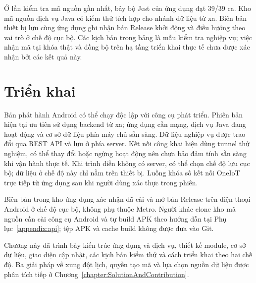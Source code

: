 \documentclass[../DoAn.tex]{subfiles}
\begin{document}
Ở lần kiểm tra mã nguồn gần nhất, bảy bộ Jest của ứng dụng đạt 39/39 ca. Kho mã nguồn dịch vụ Java có kiểm thử tích hợp cho nhánh dữ liệu từ xa. Biên bản thiết bị lưu cùng ứng dụng ghi nhận bản Release khởi động và điều hướng theo vai trò ở chế độ cục bộ. Các kịch bản trong bảng là mẫu kiểm tra nghiệp vụ; việc nhận mã tại khóa thật và đồng bộ trên hạ tầng triển khai thực tế chưa được xác nhận bởi các kết quả này.

\section{Triển khai}
Bản phát hành Android có thể chạy độc lập với công cụ phát triển. Phiên bản hiện tại ưu tiên sử dụng backend từ xa; ứng dụng cần mạng, dịch vụ Java đang hoạt động và cơ sở dữ liệu phía máy chủ sẵn sàng. Dữ liệu nghiệp vụ được trao đổi qua REST API và lưu ở phía server. Kết nối công khai hiện dùng tunnel thử nghiệm, có thể thay đổi hoặc ngừng hoạt động nên chưa bảo đảm tính sẵn sàng khi vận hành thực tế. Khi trình diễn không có server, có thể chọn chế độ lưu cục bộ; dữ liệu ở chế độ này chỉ nằm trên thiết bị. Luồng khóa số kết nối OneIoT trực tiếp từ ứng dụng sau khi người dùng xác thực trong phiên.

Biên bản trong kho ứng dụng xác nhận đã cài và mở bản Release trên điện thoại Android ở chế độ cục bộ, không phụ thuộc Metro. Người khác clone kho mã nguồn cần cài công cụ Android và tự build APK theo hướng dẫn tại Phụ lục~\ref{appendix:api}; tệp APK và cache build không được đưa vào Git.

Chương này đã trình bày kiến trúc ứng dụng và dịch vụ, thiết kế module, cơ sở dữ liệu, giao diện cập nhật, các kịch bản kiểm thử và cách triển khai theo hai chế độ. Ba giải pháp về xung đột lịch, quyền tạo mã và lựa chọn nguồn dữ liệu được phân tích tiếp ở Chương~\ref{chapter:SolutionAndContribution}.
\end{document}
